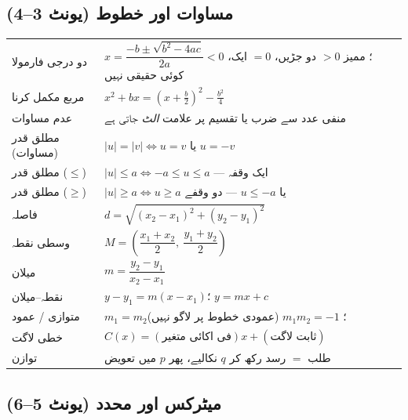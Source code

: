 \subsection*{مساوات اور خطوط (یونٹ \textenglish{3--4})}

\begin{center}
\begin{tabular}{@{}p{4.6cm} p{9.8cm}@{}}
\toprule
دو درجی فارمولا & \(x=\dfrac{-b\pm\sqrt{b^{2}-4ac}}{2a}\)؛ ممیز \(>0\) دو جڑیں، \(=0\) ایک، \(<0\) کوئی حقیقی نہیں \\
مربع مکمل کرنا & \(x^{2}+bx=\left(x+\tfrac b2\right)^{2}-\tfrac{b^{2}}{4}\) \\
عدم مساوات & منفی عدد سے ضرب یا تقسیم پر علامت \emph{الٹ} جاتی ہے \\
مطلق قدر (مساوات) & \(|u|=|v| \iff u=v\) یا \(u=-v\) \\
مطلق قدر (\(\le\)) & \(|u|\le a \iff -a\le u\le a\) --- ایک وقفہ \\
مطلق قدر (\(\ge\)) & \(|u|\ge a \iff u\ge a\) یا \(u\le -a\) --- دو وقفے \\
فاصلہ & \(d=\sqrt{(x_2-x_1)^{2}+(y_2-y_1)^{2}}\) \\
وسطی نقطہ & \(M=\left(\dfrac{x_1+x_2}{2},\ \dfrac{y_1+y_2}{2}\right)\) \\
میلان & \(m=\dfrac{y_2-y_1}{x_2-x_1}\) \\
نقطہ--میلان & \(y-y_1=m(x-x_1)\)؛ \quad \(y=mx+c\) \\
متوازی / عمود & \(m_1=m_2\)؛ \quad \(m_1m_2=-1\) (عمودی خطوط پر لاگو نہیں) \\
خطی لاگت & \(C(x)=(\text{فی اکائی متغیر})x+(\text{ثابت لاگت})\) \\
توازن & طلب \(=\) رسد رکھ کر \(q\) نکالیے، پھر \(p\) میں تعویض \\
\bottomrule
\end{tabular}
\end{center}

\subsection*{میٹرکس اور محدد (یونٹ \textenglish{5--6})}

